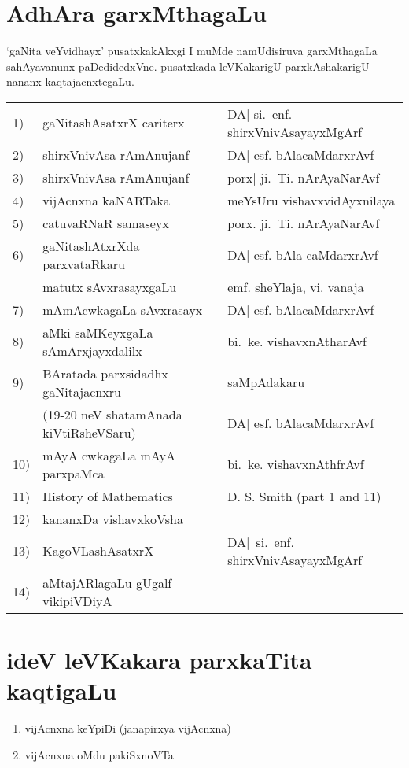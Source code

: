 {\section*{AdhAra garxMthagaLu}

`gaNita veYvidhayx' pusatxkakAkxgi I muMde namUdisiruva garxMthagaLa sahAyavanunx paDedidedxVne. pusatxkada leVKakarigU parxkAshakarigU nananx kaqtajacnxtegaLu.

\begin{longtable}{l>{\raggedright}p{4cm}>{\raggedright}p{4cm}}
{\rm 1)} &  gaNitashAsatxrX cariterx & DA| si.~enf. shirxVnivAsayayxMgArf \tabularnewline
{\rm 2)} & shirxVnivAsa rAmAnujanf & DA| esf. bAlacaMdarxrAvf\tabularnewline
{\rm 3)} & shirxVnivAsa rAmAnujanf & porx| ji.~Ti. nArAyaNarAvf\tabularnewline
{\rm 4)} & vijAcnxna kaNARTaka & meYsUru vishavxvidAyxnilaya\tabularnewline
{\rm 5)} & catuvaRNaR samaseyx & porx. ji.~Ti. nArAyaNarAvf\tabularnewline
{\rm 6)} & gaNitashAtxrXda parxvataRkaru & DA| esf. bAla caMdarxrAvf\tabularnewline[-0.1cm]
& matutx sAvxrasayxgaLu & emf. sheYlaja, vi. vanaja\tabularnewline
{\rm 7)} & mAmAcwkagaLa sAvxrasayx & DA| esf. bAlacaMdarxrAvf\tabularnewline
{\rm 8)} & aMki saMKeyxgaLa sAmArxjayxdalilx & bi.~ke. vishavxnAtharAvf\tabularnewline
{\rm 9)} & BAratada parxsidadhx gaNitajacnxru  & saMpAdakaru \tabularnewline[-0.1cm]
& ({\rm 19-20} neV shatamAnada kiVtiRsheVSaru) & DA| esf. bAlacaMdarxrAvf\tabularnewline
{\rm 10)} & mAyA cwkagaLa mAyA parxpaMca & bi.~ke. vishavxnAthfrAvf\tabularnewline
{\rm 11)} & {\rm History of Mathematics} & {\rm D. S. Smith (part 1 and 11)}\tabularnewline[-0.1cm]
{\rm 12)} & kananxDa vishavxkoVsha &\tabularnewline
{\rm 13)} & KagoVLashAsatxrX & DA|~si.~enf. shirxVnivAsayayxMgArf\tabularnewline
{\rm 14)} & aMtajARlagaLu-gUgalf vikipiVDiyA &\tabularnewline
\end{longtable}

\section*{ideV leVKakara parxkaTita kaqtigaLu}

\begin{enumerate}
\item vijAcnxna keYpiDi (janapirxya vijAcnxna)

\item vijAcnxna oMdu pakiSxnoVTa


\end{enumerate}}
